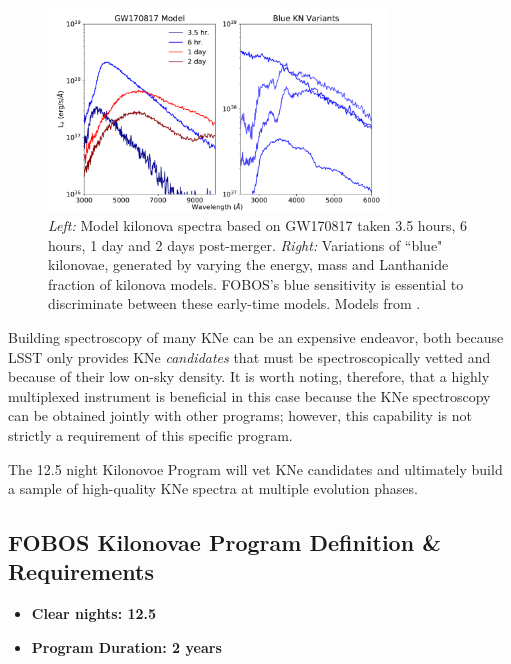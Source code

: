 \documentclass[11pt,a4paper,twoside,onecolumn,openany,final,oldfontcommands]{memoir}
\begin{document}

\begin{figure}
\begin{center}
\includegraphics[width=0.8\textwidth]{figs/kn_fobos.pdf}
\end{center}
\caption[Model spectra of kilonovae]{\textit{Left:} Model kilonova spectra based on GW170817 taken 3.5 hours, 6 hours, 1 day and 2 days post-merger. \textit{Right:} Variations of ``blue" kilonovae, generated by varying the energy, mass and Lanthanide fraction of kilonova models. FOBOS's blue sensitivity is essential to discriminate between these early-time models. Models from \citet{kasen2017}.}
\label{fig:kilonova}    
\end{figure}

Building spectroscopy of many KNe can be an expensive endeavor, both because LSST only provides KNe \textit{candidates} that must be spectroscopically vetted and because of their low on-sky density.  It is worth noting, therefore, that a highly multiplexed instrument is beneficial in this case because the KNe spectroscopy can be obtained jointly with other programs; however, this capability is not strictly a requirement of this specific program.

The 12.5 night Kilonovoe Program will vet KNe candidates and ultimately build a sample of high-quality KNe spectra at multiple evolution phases.  

\subsection{FOBOS Kilonovae Program Definition \& Requirements}

\medskip
\begin{itemize}[leftmargin=0.3in, itemsep=0pt]
	\item[] \textbf{Clear nights: 12.5}
	\item[] \textbf{Program Duration: 2 years}
\end{itemize}
\end{document}
